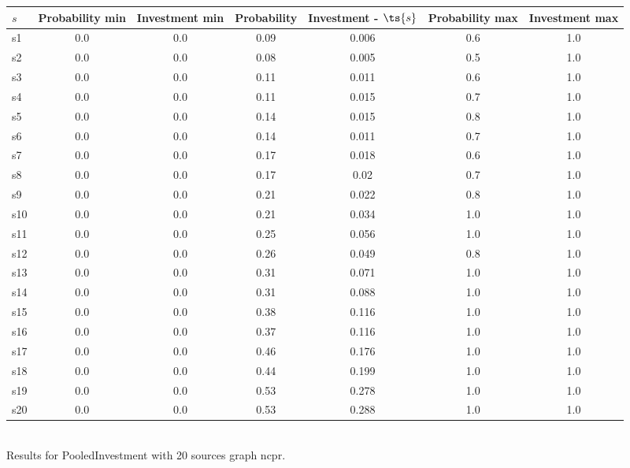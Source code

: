 \documentclass{article}
\begin{document}
\noindent\begin{tabular}{|l|c|c|c|c|c|c|}
\hline
$s$& Probability min & Investment min & Probability & Investment - $\ts{s}$ & Probability max & Investment max\\
\hline
s1 &0.0 & 0.0 & 0.09 & 0.006 & 0.6 & 1.0\\
\hline
s2 &0.0 & 0.0 & 0.08 & 0.005 & 0.5 & 1.0\\
\hline
s3 &0.0 & 0.0 & 0.11 & 0.011 & 0.6 & 1.0\\
\hline
s4 &0.0 & 0.0 & 0.11 & 0.015 & 0.7 & 1.0\\
\hline
s5 &0.0 & 0.0 & 0.14 & 0.015 & 0.8 & 1.0\\
\hline
s6 &0.0 & 0.0 & 0.14 & 0.011 & 0.7 & 1.0\\
\hline
s7 &0.0 & 0.0 & 0.17 & 0.018 & 0.6 & 1.0\\
\hline
s8 &0.0 & 0.0 & 0.17 & 0.02 & 0.7 & 1.0\\
\hline
s9 &0.0 & 0.0 & 0.21 & 0.022 & 0.8 & 1.0\\
\hline
s10 &0.0 & 0.0 & 0.21 & 0.034 & 1.0 & 1.0\\
\hline
s11 &0.0 & 0.0 & 0.25 & 0.056 & 1.0 & 1.0\\
\hline
s12 &0.0 & 0.0 & 0.26 & 0.049 & 0.8 & 1.0\\
\hline
s13 &0.0 & 0.0 & 0.31 & 0.071 & 1.0 & 1.0\\
\hline
s14 &0.0 & 0.0 & 0.31 & 0.088 & 1.0 & 1.0\\
\hline
s15 &0.0 & 0.0 & 0.38 & 0.116 & 1.0 & 1.0\\
\hline
s16 &0.0 & 0.0 & 0.37 & 0.116 & 1.0 & 1.0\\
\hline
s17 &0.0 & 0.0 & 0.46 & 0.176 & 1.0 & 1.0\\
\hline
s18 &0.0 & 0.0 & 0.44 & 0.199 & 1.0 & 1.0\\
\hline
s19 &0.0 & 0.0 & 0.53 & 0.278 & 1.0 & 1.0\\
\hline
s20 &0.0 & 0.0 & 0.53 & 0.288 & 1.0 & 1.0\\
\hline
\end{tabular}\\

\noindent Results for PooledInvestment with 20 sources graph ncpr.
\end{document}
